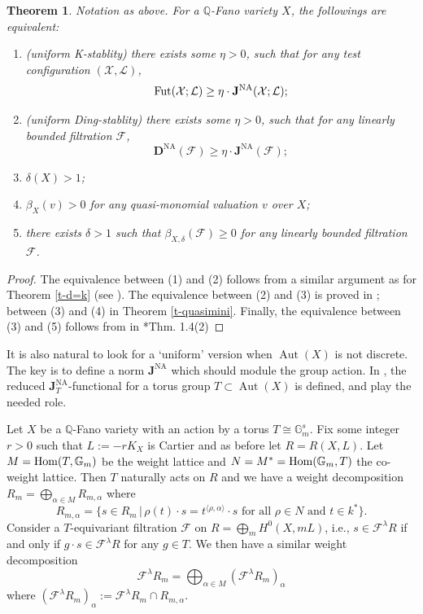 \documentclass[12pt,reqno]{amsart}%
\newcommand{\Aut}[0]{\operatorname{Aut}}
\newcommand{\bG}{{\mathbb{G} }}
\newcommand{\cX}{{\mathcal{X}}}
\newcommand{\cL}{{\mathcal{L}}}
\newcommand{\cF}{\mathcal{F}}
\newcommand{\DNA}{\mathbf{D}^{\mathrm{NA}}}
\newcommand{\JNA}{\mathbf{J}^{\mathrm{NA}}}
\newcommand{\Hom}{{\rm Hom}}
\newtheorem{thm}{Theorem}[section]
\theoremstyle{definition}
\theoremstyle{remark}
\newcommand{\Fut}{{\rm Fut}}
\newcommand{\bQ}{{\mathbb{Q}}}
\newcommand{\ra}{{\rangle}}
\begin{document}
\begin{thm}\label{t-uniform}
Notation as above. For a $\bQ$-Fano variety $X$, the followings are equivalent:
\begin{enumerate}
\item (uniform K-stablity) there exists some $\eta>0$, such that for any test configuration $(\cX,\cL)$, 
$$\Fut(\cX;\cL)\ge \eta\cdot  \JNA(\cX;\cL);$$
\item (uniform Ding-stablity) there exists some $\eta>0$, such that for any linearly bounded filtration $\cF$, 
$$\DNA(\cF)\ge \eta\cdot  \JNA(\cF);$$
\item $\delta(X)>1$;
\item $\beta_X(v)> 0$ for any quasi-monomial valuation $v$ over $X$;
\item there exists $\delta> 1$ such that $\beta_{X,\delta}(\cF)\ge 0$ for any linearly bounded filtration $\cF$.
\end{enumerate}
\end{thm}
\begin{proof}The equivalence between (1) and (2) follows from a similar argument as for Theorem \ref{t-d=k} (see \cite{BBJ15, Fuj19b}). The equivalence between (2) and (3) is proved in \cite[Theorem 1.4]{Fuj19b}; between (3) and (4) in  Theorem \ref{t-quasimini}. Finally, the equivalence between (3) and (5) follows from in \cite{XZ19}*{Thm. 1.4(2)}
\end{proof}

It is also natural to look for a `uniform' version when $\Aut(X)$ is not discrete. The key is to define a norm $\JNA$ which should module the group action. In \cite{His16},  the reduced $\JNA_T$-functional for a torus group $T\subset \Aut(X)$ is defined, and play the needed role.


Let $X$ be a $\mathbb Q$-Fano variety with an action by a torus $T\cong \bG_m^s$. Fix some integer $r>0$ such that $L:=-rK_X$ is Cartier and as before let $R=R(X,L)$. Let $M=\Hom(T,\bG_m)$ be the weight lattice and $N=M^*=\Hom(\bG_m,T)$ the co-weight lattice. Then $T$ naturally acts on $R$ and we have a weight decomposition $R_m=\bigoplus_{\alpha\in M} R_{m,\alpha}$ where 
\[
R_{m,\alpha}=\{s\in R_m\,|\,\rho(t)\cdot s = t^{\langle \rho,\alpha \ra}\cdot s\text{ for all }\rho\in N\text{ and }t\in k^*\}.
\]
Consider a $T$-equivariant filtration $\cF$ on $R=\bigoplus_mH^0(X,mL)$, i.e., $s\in \cF^\lambda R$ if and only if $g\cdot s\in \cF^\lambda R$ for any $g\in T$. We then have a similar weight decomposition 
\[
\cF^\lambda R_m=\bigoplus_{\alpha\in M} (\cF^\lambda R_m)_\alpha
\]
where $(\cF^\lambda R_m)_\alpha := \cF^\lambda R_m \cap R_{m,\alpha}$.
\end{document}
